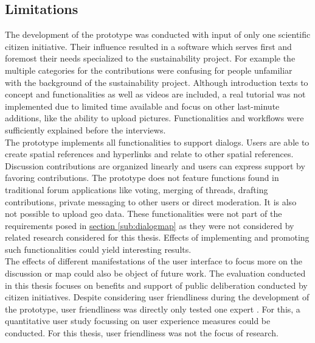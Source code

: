 \subsection{Limitations}
\label{sub:limitations}
The development of the prototype was conducted with input of only one scientific citizen initiative. Their influence resulted in a software which serves first and foremost their needs specialized to the sustainability project. For example the multiple categories for the contributions were confusing for people unfamiliar with the background of the sustainability project. Although introduction texts to concept and functionalities as well as videos are included, a real tutorial was not implemented due to limited time available and focus on other last-minute additions, like the ability to upload pictures. Functionalities and workflows were sufficiently explained before the interviews.\\
The prototype implements all functionalities to support dialogs. Users are able to create spatial references and hyperlinks and relate to other spatial references.  Discussion contributions are organized linearly and users can express support by favoring contributions. The prototype does not feature functions found in traditional forum applications like voting, merging of threads, drafting contributions, private messaging to other users or direct moderation. It is also not possible to upload geo data. These functionalities were not part of the requirements posed in \hyperref[sub:dialogmap]{section \ref{sub:dialogmap}} as they were not considered by related research considered for this thesis. Effects of implementing and promoting such functionalities could yield interesting results.\\%
The effects of different manifestations of the user interface to focus more on the discussion or map could also be object of future work.
The evaluation conducted in this thesis focuses on benefits and support of public deliberation conducted by citizen initiatives. Despite considering user friendliness during the development of the prototype, user friendliness was directly only tested one expert . For this, a quantitative user study focussing on user experience measures could be conducted. For this thesis, user friendliness was not the focus of research.\\
